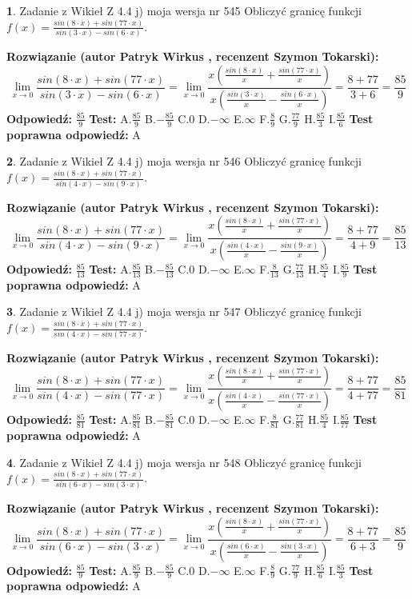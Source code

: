 \documentclass[12pt, a4paper]{article}
\theoremstyle{definition} %
\newtheorem{zad}{}
\newcommand{\zadStart}[1]{\begin{zad}#1\newline}
\newcommand{\zadStop}{\end{zad}}
\newcommand{\rozwStart}[2]{\noindent \textbf{Rozwiązanie (autor #1 , recenzent #2): }\newline}
\newcommand{\rozwStop}{\newline}
\newcommand{\odpStart}{\noindent \textbf{Odpowiedź:}\newline}
\newcommand{\odpStop}{\newline}
\newcommand{\testStart}{\noindent \textbf{Test:}\newline}
\newcommand{\testStop}{\newline}
\newcommand{\kluczStart}{\noindent \textbf{Test poprawna odpowiedź:}\newline}
\newcommand{\kluczStop}{\newline}
\begin{document}
\zadStart{Zadanie z Wikieł Z 4.4 j) moja wersja nr 545}
Obliczyć granicę funkcji $f(x)=\frac{sin(8\cdot x) +sin(77\cdot x)}{sin(3\cdot x) -sin(6\cdot x)}$.
\zadStop
\rozwStart{Patryk Wirkus}{Szymon Tokarski}
$$\lim\limits_{x\to 0}\frac{sin(8\cdot x) +sin(77\cdot x)}{sin(3\cdot x) -sin(6\cdot x)}=\lim\limits_{x\to 0}\frac{x(\frac{sin(8\cdot x)}{x}+\frac{sin(77\cdot x)}{x})}{x(\frac{sin(3\cdot x)}{x}-\frac{sin(6\cdot x)}{x})}=\frac{8+77}{3+6} = \frac{85}{9}$$
\rozwStop
\odpStart
$\frac{85}{9}$
\odpStop
\testStart
A.$\frac{85}{9}$
B.$-\frac{85}{9}$
C.$0$
D.$-\infty$
E.$\infty$
F.$\frac{8}{9}$
G.$\frac{77}{9}$
H.$\frac{85}{3}$
I.$\frac{85}{6}$
\testStop
\kluczStart
A
\kluczStop



\zadStart{Zadanie z Wikieł Z 4.4 j) moja wersja nr 546}
Obliczyć granicę funkcji $f(x)=\frac{sin(8\cdot x) +sin(77\cdot x)}{sin(4\cdot x) -sin(9\cdot x)}$.
\zadStop
\rozwStart{Patryk Wirkus}{Szymon Tokarski}
$$\lim\limits_{x\to 0}\frac{sin(8\cdot x) +sin(77\cdot x)}{sin(4\cdot x) -sin(9\cdot x)}=\lim\limits_{x\to 0}\frac{x(\frac{sin(8\cdot x)}{x}+\frac{sin(77\cdot x)}{x})}{x(\frac{sin(4\cdot x)}{x}-\frac{sin(9\cdot x)}{x})}=\frac{8+77}{4+9} = \frac{85}{13}$$
\rozwStop
\odpStart
$\frac{85}{13}$
\odpStop
\testStart
A.$\frac{85}{13}$
B.$-\frac{85}{13}$
C.$0$
D.$-\infty$
E.$\infty$
F.$\frac{8}{13}$
G.$\frac{77}{13}$
H.$\frac{85}{4}$
I.$\frac{85}{9}$
\testStop
\kluczStart
A
\kluczStop



\zadStart{Zadanie z Wikieł Z 4.4 j) moja wersja nr 547}
Obliczyć granicę funkcji $f(x)=\frac{sin(8\cdot x) +sin(77\cdot x)}{sin(4\cdot x) -sin(77\cdot x)}$.
\zadStop
\rozwStart{Patryk Wirkus}{Szymon Tokarski}
$$\lim\limits_{x\to 0}\frac{sin(8\cdot x) +sin(77\cdot x)}{sin(4\cdot x) -sin(77\cdot x)}=\lim\limits_{x\to 0}\frac{x(\frac{sin(8\cdot x)}{x}+\frac{sin(77\cdot x)}{x})}{x(\frac{sin(4\cdot x)}{x}-\frac{sin(77\cdot x)}{x})}=\frac{8+77}{4+77} = \frac{85}{81}$$
\rozwStop
\odpStart
$\frac{85}{81}$
\odpStop
\testStart
A.$\frac{85}{81}$
B.$-\frac{85}{81}$
C.$0$
D.$-\infty$
E.$\infty$
F.$\frac{8}{81}$
G.$\frac{77}{81}$
H.$\frac{85}{4}$
I.$\frac{85}{77}$
\testStop
\kluczStart
A
\kluczStop



\zadStart{Zadanie z Wikieł Z 4.4 j) moja wersja nr 548}
Obliczyć granicę funkcji $f(x)=\frac{sin(8\cdot x) +sin(77\cdot x)}{sin(6\cdot x) -sin(3\cdot x)}$.
\zadStop
\rozwStart{Patryk Wirkus}{Szymon Tokarski}
$$\lim\limits_{x\to 0}\frac{sin(8\cdot x) +sin(77\cdot x)}{sin(6\cdot x) -sin(3\cdot x)}=\lim\limits_{x\to 0}\frac{x(\frac{sin(8\cdot x)}{x}+\frac{sin(77\cdot x)}{x})}{x(\frac{sin(6\cdot x)}{x}-\frac{sin(3\cdot x)}{x})}=\frac{8+77}{6+3} = \frac{85}{9}$$
\rozwStop
\odpStart
$\frac{85}{9}$
\odpStop
\testStart
A.$\frac{85}{9}$
B.$-\frac{85}{9}$
C.$0$
D.$-\infty$
E.$\infty$
F.$\frac{8}{9}$
G.$\frac{77}{9}$
H.$\frac{85}{6}$
I.$\frac{85}{3}$
\testStop
\kluczStart
A
\kluczStop
\end{document}
